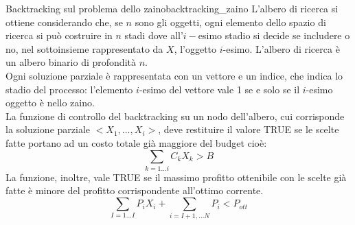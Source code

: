 \documentclass[12pt]{report}
\newcommand{\nmu}{}
\begin{document}
 	\begin{example}{\nmu Backtracking sul problema dello zaino}{backtracking_zaino}
 		L'albero di ricerca si ottiene considerando che, se $n$ sono gli oggetti, ogni elemento dello spazio di ricerca si può costruire in $n$ stadi dove all'$i-$esimo stadio si decide se includere o no, nel sottoinsieme rappresentato da $X$, l'oggetto $i$-esimo. L'albero di ricerca è un albero binario di profondità $n$. \\
 		Ogni soluzione parziale è rappresentata con un vettore e un indice, che indica lo stadio del processo: l'elemento $i$-esimo del vettore vale 1 se e solo se il $i$-esimo oggetto è nello zaino. \\
 		La funzione di controllo del backtracking su un nodo dell'albero, cui corrisponde la soluzione parziale $<X_1, \dots, X_i>$, deve restituire il valore TRUE se le scelte fatte portano ad un costo totale già maggiore del budget cioè:
 		\[
 		\sum_{k=1\dots i}C_kX_k > B
 		\]
 		La funzione, inoltre, vale TRUE se il massimo profitto ottenibile con le scelte già fatte è minore del profitto corrispondente all'ottimo corrente.
 		\[
 		\sum_{I = 1\dots I} P_iX_i + \sum_{i=I+1,\dots N}P_i < P_{ott}
 		\]
 	\end{example}
\end{document}
